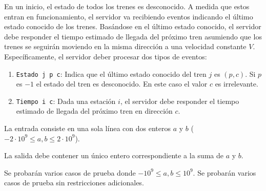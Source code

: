 \documentclass{oci}
\begin{document}
\begin{problemDescription}
  En un inicio, el estado de todos los trenes es
  desconocido.
  A medida que estos entran en funcionamiento, el
  servidor va recibiendo eventos indicando el
  último estado conocido de los trenes.
  Basándose en el último estado conocido, el servidor
  debe responder el tiempo estimado de llegada del
  próximo tren asumiendo que los trenes se seguirán
  moviendo en la misma dirección a una velocidad
  constante $V$.
  Específicamente, el servidor deber procesar dos tipos
  de eventos:
  \begin{enumerate}
    \item \texttt{Estado j p c}: Indica que el último
    estado conocido del tren $j$ es $(p, c)$.
    Si $p$ es $-1$ el estado del tren es desconocido.
    En este caso el valor $c$ es irrelevante.
    \item \texttt{Tiempo i c}: Dada una estación $i$,
    el servidor debe responder el tiempo estimado de
    llegada del próximo tren en dirección $c$.
  \end{enumerate}
\end{problemDescription}

\begin{inputDescription}
  La entrada consiste en una sola línea con dos enteros $a$ y $b$ ($-2\cdot10^9 \leq a, b \leq 2\cdot10^9$).
\end{inputDescription}

\begin{outputDescription}
  La salida debe contener un único entero correspondiente a la suma de $a$ y $b$.
\end{outputDescription}

\begin{scoreDescription}
   Se probarán varios casos de prueba donde $-10^9\leq a, b \leq 10^9$.
   Se probarán varios casos de prueba sin restricciones adicionales.
\end{scoreDescription}

\begin{sampleDescription}
\end{sampleDescription}
\end{document}
